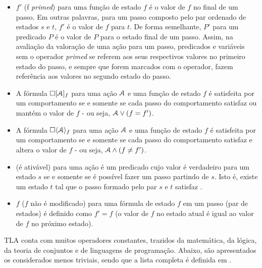 \begin{itemize}
  \item $f'$ (f \textit{primed}) para uma função de estado $f$ é o valor de $f$ no final de um passo. Em outras palavras, para um passo composto pelo par ordenado de estados $s$ e $t$, $f'$ é o valor de $f$ para $t$. De forma semelhante, $P'$ para um predicado $P$ é o valor de $P$ para o estado final de um passo. Assim, na avaliação da valoração de uma ação para um passo, predicados e variáveis sem o operador \textit{primed} se referem aos seus respectivos valores no primeiro estado do passo, e sempre que forem marcados com o operador, fazem referência aos valores no segundo estado do passo.

  \item A fórmula $\square [\textbf{$\mathcal{A}$}]_f$ para uma ação $\textbf{$\mathcal{A}$}$ e uma função de estado $f$ é satisfeita por um comportamento se e somente se cada passo do comportamento satisfaz \FANCYA ou mantém o valor de $f$ - ou seja, $\textbf{$\mathcal{A}$} \lor (f = f')$.

  \item A fórmula $\square \langle\textbf{$\mathcal{A}$}\rangle_f$ para uma ação $\textbf{$\mathcal{A}$}$ e uma função de estado $f$ é satisfeita por um comportamento se e somente se cada passo do comportamento satisfaz \FANCYA e altera o valor de $f$ - ou seja, $\textbf{$\mathcal{A}$} \land (f \neq f')$.

  \item \ENABLED \FANCYA (\FANCYA é ativável) para uma ação \FANCYA é um predicado cujo valor é verdadeiro para um estado $s$ se e somente se é possível fazer um passo \FANCYA partindo de $s$. Isto é, existe um estado $t$ tal que o passo formado pelo par $s$ e $t$ satisfaz \FANCYA.

  \item \UNCHANGED $f$ ($f$ não é modificado) para uma fórmula de estado $f$ em um passo (par de estados) é definido como $f' = f$  (o valor de $f$ no estado atual é igual ao valor de $f$ no próximo estado).

\end{itemize}

TLA conta com muitos operadores constantes, trazidos da matemática, da lógica, da teoria de conjuntos e de linguagens de programação. Abaixo, são apresentados os considerados menos triviais, sendo que a lista completa é definida em \cite{specifying-systems}.

